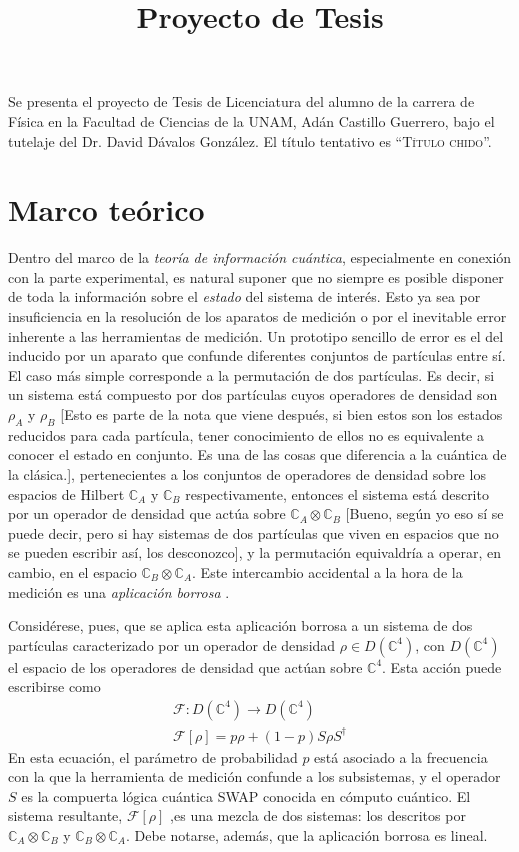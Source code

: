 \documentclass[onecolumn,11pt]{article}
\title{Proyecto de Tesis} \date{}
\newcommand{\mcF}{\mathcal{F}}
\newcommand{\Hh}{\mathbb{C}} %
\newcommand{\nota}[1]{{\color{red} [#1]}}
\newcommand{\notaAd}[1]{{\color{blue} [#1]}} %
\begin{document}
\maketitle
\thispagestyle{empty}
Se presenta el proyecto de Tesis de Licenciatura del alumno de la carrera de Física en la Facultad de Ciencias de la UNAM, Adán Castillo Guerrero, bajo el tutelaje del Dr. David Dávalos González. El título tentativo es ``\textsc{Título chido}''.

\section{Marco teórico}


Dentro del marco de la \textit{teoría de información cuántica}, especialmente en conexión con la parte experimental, es natural suponer que no siempre es posible disponer de toda la información sobre el \textit{estado} del sistema de interés. Esto ya sea por insuficiencia en la resolución de los aparatos de medición o por el inevitable error inherente a las herramientas de medición. Un prototipo sencillo de error es el del inducido por un aparato que confunde diferentes conjuntos de partículas entre sí. El caso más simple corresponde a la permutación de dos partículas. Es decir, si un sistema está compuesto por dos partículas cuyos operadores de densidad son $\rho_{A}$ y $\rho_{B}$ \nota{Esto es parte de la nota que viene después, si bien estos son los estados reducidos para cada partícula, tener conocimiento de ellos no es equivalente a conocer el estado en conjunto. Es una de las cosas que diferencia a la cuántica de la clásica.}, pertenecientes a los conjuntos de operadores de densidad sobre los espacios de Hilbert $\Hh_{A}$ y $\Hh_{B}$ respectivamente, entonces el sistema está descrito por un operador de densidad que actúa sobre $\Hh_{A}\otimes\Hh_{B}$ \notaAd{Bueno, según yo eso sí se puede decir, pero si hay sistemas de dos partículas que viven en espacios que no se pueden escribir así, los desconozco}, y la permutación equivaldría a operar, en cambio, en el espacio $\Hh_{B}\otimes\Hh_{A}$. Este intercambio accidental a la hora de la medición es una \textit{aplicación borrosa} \cite{FuzzyMeasurements}.

Considérese, pues, que se aplica esta aplicación borrosa a un sistema de dos partículas caracterizado por un operador de densidad $\rho\in D(\Hh^{4})$, con $D(\Hh^{4})$ el espacio de los operadores de densidad que actúan sobre $\Hh^{4}$. Esta acción puede escribirse como
\begin{gather}
\mcF:D(\Hh^{4})\rightarrow D(\Hh^{4})\label{eq:Fuzzy2Domain}\\
\mcF[\rho]=p\rho+(1-p)S\rho S^{\dag}\label{eq:Fuzzy2}
\end{gather}
En esta ecuación, el parámetro  de probabilidad $p$ está asociado a la frecuencia con la que la herramienta de medición confunde a los subsistemas, y el operador $S$ es la compuerta lógica cuántica SWAP conocida en cómputo cuántico. El sistema resultante, $\mcF[\rho]$ ,es una mezcla de dos sistemas: los descritos por $\Hh_{A}\otimes\Hh_{B}$ y $\Hh_{B}\otimes\Hh_{A}$. Debe notarse, además, que la aplicación borrosa es lineal.
\end{document}
